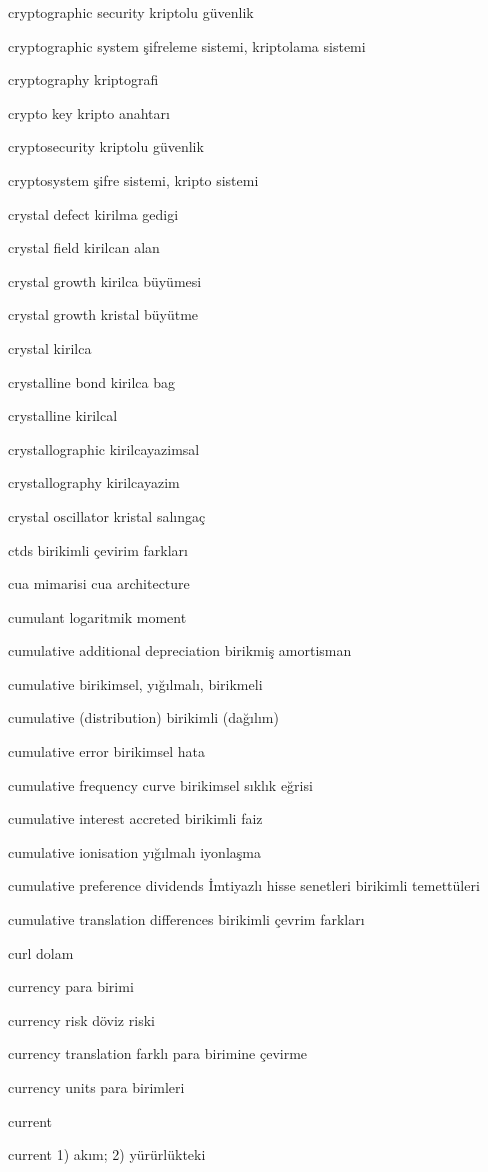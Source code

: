 \documentclass[12pt,fleqn]{article}\usepackage{../../common}
\begin{document}
cryptographic security kriptolu güvenlik

cryptographic system şifreleme sistemi, kriptolama sistemi

cryptography kriptografi

crypto key kripto anahtarı

cryptosecurity kriptolu güvenlik

cryptosystem şifre sistemi, kripto sistemi

crystal defect kirilma gedigi

crystal field kirilcan alan

crystal growth kirilca büyümesi

crystal growth kristal büyütme

crystal kirilca

crystalline bond kirilca bag

crystalline kirilcal

crystallographic kirilcayazimsal

crystallography kirilcayazim

crystal oscillator kristal salıngaç

ctds birikimli çevirim farkları

cua mimarisi cua architecture

cumulant logaritmik moment

cumulative additional depreciation birikmiş amortisman

cumulative birikimsel, yığılmalı, birikmeli

cumulative (distribution) birikimli (dağılım)

cumulative error birikimsel hata

cumulative frequency curve birikimsel sıklık eğrisi

cumulative interest accreted birikimli faiz

cumulative ionisation yığılmalı iyonlaşma

cumulative preference dividends İmtiyazlı hisse senetleri birikimli temettüleri

cumulative translation differences birikimli çevrim farkları

curl dolam

currency para birimi

currency risk döviz riski

currency translation farklı para birimine çevirme

currency units para birimleri

current

current 1) akım; 2) yürürlükteki
\end{document}
